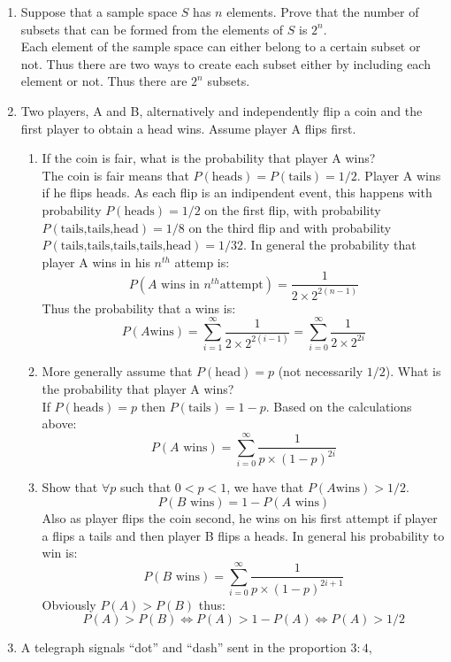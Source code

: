 \documentclass[a4paper]{article}
\begin{document}
\begin{enumerate}
  \item Suppose that a sample space $S$ has $n$ elements. Prove that the number
  of subsets that can be formed from the elements of $S$ is $2^n$. \\
  Each element of the sample space can either belong to a certain subset or not.
  Thus there are two ways to create each subset either by including each element
  or not. Thus there are $2^n$ subsets.
  \item Two players, A and B, alternatively and independently flip a coin and
  the first player to obtain a head wins. Assume player A flips first.
    \begin{enumerate}
      \item If the coin is fair, what is the probability that player A wins?\\
      The coin is fair means that $P(\text{heads})=P(\text{tails})=1/2$. Player
      A wins if he flips heads. As each flip is an indipendent event, this
      happens with probability $P(\text{heads})=1/2$ on the first flip, with
      probability $P(\text{tails,tails,head})=1/8$ on the third flip and with
      probability $P(\text{tails,tails,tails,tails,head})=1/32$. In general the
      probability that player A wins in his $n^{th}$ attemp is:
      $$P(A\text{ wins in } n^{th} \text{
      attempt})=\frac{1}{2\times2^{2(n-1)}}$$
      Thus the probability that a wins is:
      $$P(A \text{
      wins})=\sum_{i=1}^{\infty}\frac{1}{2\times2^{2(i-1)}}=\sum_{i=0}^{\infty}\frac{1}{2\times2^{2i}}$$
      \item More generally assume that $P(\text{head})=p$ (not necessarily
      $1/2$). What is the probability that player A wins?\\
      If $P(\text{heads})=p$ then $P(\text{tails})=1-p$. Based on the
      calculations above:
      $$P(A \text{ wins})=\sum_{i=0}^{\infty}\frac{1}{p\times(1-p)^{2i}}$$
      \item Show that $\forall p$ such that $0<p<1$, we have that $P(A\text{
      wins})>1/2$.
      $$P(B \text{ wins})=1-P(A \text{ wins})$$
      Also as player flips the coin second, he wins on his first attempt if
      player a flips a tails and then player B flips a heads. In general his
      probability to win is:
      $$P(B \text{ wins})=\sum_{i=0}^{\infty}\frac{1}{p\times(1-p)^{2i+1}}$$
      Obviously $P(A)>P(B)$ thus:
      $$P(A)>P(B) \Leftrightarrow P(A)>1-P(A) \Leftrightarrow P(A)>1/2$$
    \end{enumerate}
  \item A telegraph signals ``dot'' and ``dash'' sent in the proportion $3 : 4$,

\end{enumerate}
\end{document}
